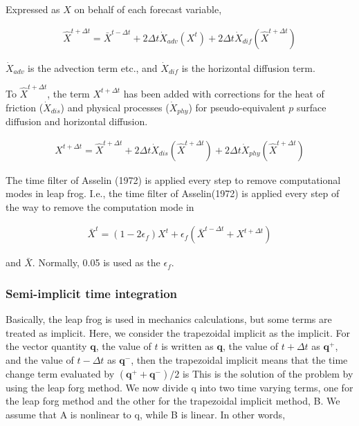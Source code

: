 Expressed as \({X}\) on behalf of each forecast variable,

\begin{eqnarray}
  \hat{X}^{t+\Delta t} 
    =  \bar{X}^{t-\Delta t}
    + 2 \Delta t 
      \dot{X}_{adv}\left( {X}^{t} \right)
    + 2 \Delta t 
      \dot{X}_{dif}\left( \hat{X}^{t+\Delta t} \right)
\end{eqnarray}

\(\dot{X}_{adv}\) is the advection term etc., and \(\dot{X}_{dif}\) is
the horizontal diffusion term.

To \(\hat{X}^{t+\Delta t}\), the term \({X}^{t+\Delta t}\) has been
added with corrections for the heat of friction (\(\dot{X}_{dis}\)) and
physical processes (\(\dot{X}_{phy}\)) for pseudo-equivalent \(p\)
surface diffusion and horizontal diffusion.

\begin{eqnarray}
  {X}^{t+\Delta t} 
    =  \hat{X}^{t+\Delta t}
    + 2 \Delta t 
      \dot{X}_{dis}\left( \hat{X}^{t+\Delta t} \right)
    + 2 \Delta t 
      \dot{X}_{phy}\left( \hat{X}^{t+\Delta t} \right)
\end{eqnarray}

The time filter of Asselin (1972) is applied every step to remove
computational modes in leap frog. I.e., the time filter of Asselin(1972)
is applied every step of the way to remove the computation mode in

\begin{eqnarray}
  \bar{X}^{t}
    = ( 1-2 \epsilon_f ) {X}^{t}
    +  \epsilon_f 
        \left( \bar{X}^{t-\Delta t} + {X}^{t+\Delta t} \right)
\end{eqnarray}

and \(\bar{X}\). Normally, 0.05 is used as the \(\epsilon_f\).

\hypertarget{semi-implicit-time-integration}{%
\subsubsection{Semi-implicit time
integration}\label{semi-implicit-time-integration}}

Basically, the leap frog is used in mechanics calculations, but some
terms are treated as implicit. Here, we consider the trapezoidal
implicit as the implicit. For the vector quantity \({\mathbf q}\), the
value of \(t\) is written as \({\mathbf q}\), the value of
\(t+\Delta t\) as \({\mathbf q}^+\), and the value of \(t-\Delta t\) as
\({\mathbf q}^-\), then the trapezoidal implicit means that the time
change term evaluated by \(({\mathbf q}^+ + {\mathbf q}^- )/2\) is This
is the solution of the problem by using the leap forg method. We now
divide {q} into two time varying terms, one for the leap forg method and
the other for the trapezoidal implicit method, B. We assume that A is
nonlinear to {q}, while B is linear. In other words,

